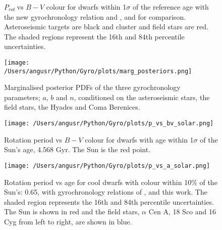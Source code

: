\documentclass[10pt,preprint]{aastex}
\newcommand{\prot}{$P_{rot}~$}
\begin{document}
\begin{figure}[ht]
\begin{center}
    \end{center}
    \caption{ \prot vs $B-V$ colour for dwarfs within 1$\sigma$ of the reference age with the new gyrochronology relation and \citet{Barnes2007}, and \citet{Mamajek2008} for comparison. Asteroseismic targets are black and cluster and field stars are red. The shaded regions represent the 16th and 84th percentile uncertainties.
     }
   \label{fig:subfigures2}
\end{figure}

\begin{figure}[ht]
\begin{center}
\texttt{[image: /Users/angusr/Python/Gyro/plots/marg\_posteriors.png]}
\caption{Marginalised posterior PDFs of the three gyrochronology parameters; $a$, $b$ and $n$, conditioned on the asteroseismic stars, the field stars, the Hyades and Coma Berenices.}
\label{fig:marg_posteriors}
\end{center}
\end{figure}

\begin{figure}[ht]
\begin{center}
\texttt{[image: /Users/angusr/Python/Gyro/plots/p\_vs\_bv\_solar.png]}
\caption{Rotation period vs $B-V$ colour for dwarfs with age within 1$\sigma$ of the Sun's age, 4.568 Gyr. The Sun is the red point.}
\label{fig:p_vs_bv_solar}
\end{center}
\end{figure}

\begin{figure}[ht]
\begin{center}
\texttt{[image: /Users/angusr/Python/Gyro/plots/p\_vs\_a\_solar.png]}
\caption{Rotation period vs age for cool dwarfs with colour within 10\% of the Sun's: 0.65, with gyrochronology relations of \citet{Barnes2007}, \citet{Mamajek2008} and this work. The shaded region represents the 16th and 84th percentile uncertainties. The Sun is shown in red and the field stars, $\alpha$ Cen A, 18 Sco and 16 Cyg from left to right, are shown in blue.}
\label{fig:p_vs_a_solar}
\end{center}
\end{figure}
\end{document}
